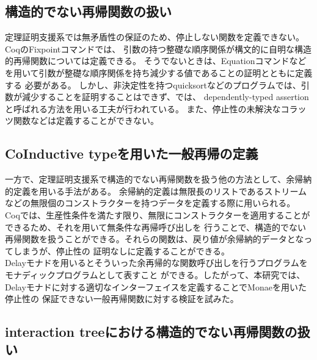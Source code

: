 \documentclass[japanese]{jssst_ppl}
\theoremstyle{definition}
\begin{document}
\subsection{構造的でない再帰関数の扱い}
定理証明支援系では無矛盾性の保証のため、停止しない関数を定義できない。CoqのFixpointコマンドでは、
引数の持つ整礎な順序関係が構文的に自明な構造的再帰関数については定義できる。%
そうでないときは、Equationコマンドなどを用いて引数が整礎な順序関係を持ち減少する値であることの証明とともに定義する
必要がある。
しかし、非決定性を持つquicksortなどのプログラムでは、引数が減少することを証明することはできず、\cite{ddd}では、
dependently-typed assertionと呼ばれる方法を用いる工夫が行われている。
また、停止性の未解決なコラッツ関数などは定義することができない。

\subsection{CoInductive typeを用いた一般再帰の定義}
一方で、定理証明支援系で構造的でない再帰関数を扱う他の方法として、余帰納的定義を用いる手法がある。
余帰納的定義は無限長のリストであるストリームなどの無限個のコンストラクターを持つデータを定義する際に用いられる。
Coqでは、生産性条件を満たす限り、無限にコンストラクターを適用することができるため、それを用いて無条件な再帰呼び出しを
行うことで、構造的でない再帰関数を扱うことができる。それらの関数は、戻り値が余帰納的データとなってしまうが、停止性の
証明なしに定義することができる。\\
Delayモナド\cite{ddd}を用いるとそういった余再帰的な関数呼び出しを行うプログラムをモナディックプログラムとして表すこと
ができる。したがって、本研究では、Delayモナドに対する適切なインターフェイスを定義することでMonaeを用いた停止性の
保証できない一般再帰関数に対する検証を試みた。


\subsection{interaction treeにおける構造的でない再帰関数の扱い}




\end{document}
